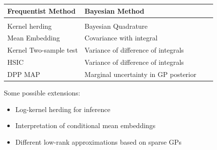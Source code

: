 \documentclass[usenames,dvipsnames]{beamer}
\begin{document}
\begin{frame}[plain, t]
	\begin{table}[t]
	\label{sample-table}
	\begin{center}
	\begin{tabular}{llll}
	\multicolumn{1}{l}{ \bf Frequentist Method}  &\multicolumn{1}{l}{\bf Bayesian Method}
	\\ \hline \\
	Kernel herding        					& Bayesian Quadrature \\
	Mean Embedding        					& Covariance with integral \\	
	Kernel Two-sample test				    & Variance of difference of integrals \\
	HSIC  & Variance of difference of integrals\\	
DPP MAP & Marginal uncertainty in GP posterior
	\end{tabular}
	\end{center}
	\end{table}

\pause 

Some possible extensions:
\pause
\begin{itemize}
	\item Log-kernel herding for inference
	\pause
	\item Interpretation of conditional mean embeddings
	\pause
	\item Different low-rank approximations based on sparse GPs
\end{itemize}
\end{frame}
\end{document}
